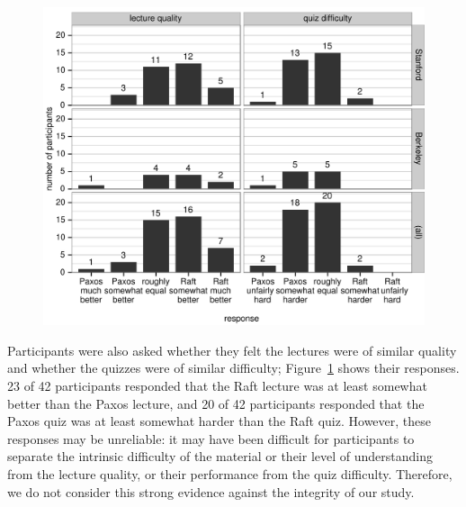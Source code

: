 \begin{figure}
\centering
{
\includegraphics{userstudy/surveyfair}
}
\label{fig:userstudy:surveyfair}
\end{figure}

Participants were also asked whether they felt the lectures were of
similar quality and whether the quizzes were of similar difficulty;
Figure~\ref{fig:userstudy:surveyfair} shows their responses.
23 of 42 participants responded that the Raft lecture was at least
somewhat better than the Paxos lecture, and 20 of 42 participants
responded that the Paxos quiz was at least somewhat harder than the Raft
quiz.
However, these responses may be unreliable: it may have been difficult
for participants to separate
the intrinsic difficulty of the material or
their level of understanding from the
lecture quality, or their performance from the quiz difficulty.
Therefore, we do not consider this strong evidence against the integrity
of our study.

